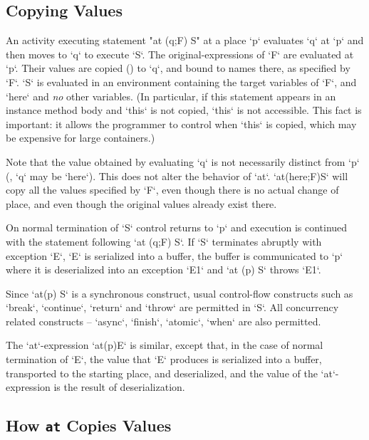 \subsection{Copying Values}
An activity executing statement \xcd"at (q;F) S" at a place \xcd`p`
evaluates \xcd`q` at \xcd`p` and then moves to \xcd`q` to execute
\xcd`S`.  
The original-expressions of \xcd`F` are evaluated at \xcd`p`.
Their values are copied () to \xcd`q`, and bound to 
names there, as specified by \xcd`F`.  
\xcd`S` is evaluated in an environment containing the target variables of
\xcd`F`, and \xcd`here` and {\em no} other variables.  (In particular, if this
statement appears in an instance method body and \xcd`this` is not copied,
\xcd`this` is not accessible.  This fact is important: it allows the
programmer to control when \xcd`this` is copied, which may be expensive for
large containers.)


Note that the value obtained by evaluating \xcd`q`
is not necessarily distinct from \xcd`p` (\eg, \xcd`q` may be
\xcd`here`). 
This does not alter the behavior of \xcd`at`.  
 \xcd`at(here;F)S` will copy all the values specified by \xcd`F`, 
even though there is no actual change of place, and even though the original
values already exist there.


On normal termination of \xcd`S` control returns to \xcd`p` and
execution is continued with the statement following \xcd`at (q;F) S`. If
\xcd`S` terminates abruptly with exception \xcd`E`, \xcd`E` is
serialized into a buffer, the buffer is communicated to \xcd`p` where
it is deserialized into an exception \xcd`E1` and \xcd`at (p) S`
throws \xcd`E1`.

Since \xcd`at(p) S` is a synchronous construct, usual control-flow
constructs such as \xcd`break`, \xcd`continue`, \xcd`return` and 
\xcd`throw` are permitted in \xcd`S`.  All concurrency related
constructs -- \xcd`async`, \xcd`finish`, \xcd`atomic`, \xcd`when` are
also permitted.

The \xcd`at`-expression \xcd`at(p)E` is similar, except that, in the case of
normal termination of \xcd`E`, the value that \xcd`E` produces is serialized
into a buffer, transported to the starting place, and deserialized, and the
value of the \xcd`at`-expression is the result of deserialization.




\subsection{How {\tt at} Copies Values}
\label{sect:at-init-val}

